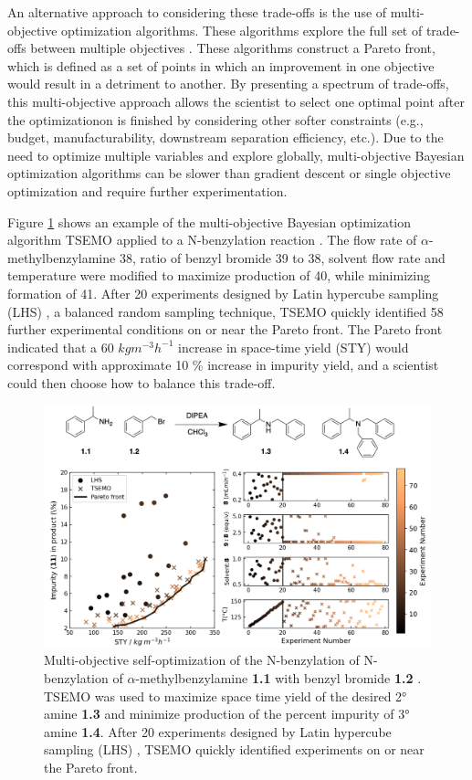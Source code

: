 An alternative approach to considering these trade-offs is the use of multi-objective optimization algorithms. These algorithms explore the full set of trade-offs between multiple objectives \cite{Bradford2018, Schweidtmann2018}. These algorithms construct a Pareto front, which is defined as a set of points in which an improvement in one objective would result in a detriment to another. By presenting a spectrum of trade-offs, this multi-objective approach allows the scientist to select one optimal point after the optimizationon is finished by considering other softer constraints (e.g., budget, manufacturability, downstream separation efficiency, etc.). Due to the need to optimize multiple variables and explore globally, multi-objective Bayesian optimization algorithms can be slower than gradient descent or single objective optimization and require further experimentation.

Figure \ref{fig:schweidtmann_example} shows an example of the multi-objective Bayesian optimization algorithm TSEMO \cite{Bradford2018} applied to a N-benzylation reaction \cite{Schweidtmann2018}. The flow rate of $\alpha$-methylbenzylamine 38, ratio of benzyl bromide 39 to 38, solvent flow rate and temperature were modified to maximize production of 40, while minimizing formation of 41. After 20 experiments designed by Latin hypercube sampling (LHS) \cite{McKay1979}, a balanced random sampling technique, TSEMO quickly identified 58 further experimental conditions on or near the Pareto front. The Pareto front indicated that a 60 $kg m^{-3} h^{-1}$ increase in space-time yield (STY) would correspond with approximate 10 \% increase in impurity yield, and a scientist could then choose how to balance this trade-off.

\begin{figure}
    \centering
    \includegraphics[width=\textwidth]{gfx/Chapter03/schweidtmann_thesis.png}
    \caption{Multi-objective self-optimization of the N-benzylation of N-benzylation of $\alpha$-methylbenzylamine \textbf{1.1} with benzyl bromide \textbf{1.2} \cite{Schweidtmann2018}. TSEMO \cite{Bradford2018} was used to maximize space time yield of the desired 2° amine \textbf{1.3} and minimize production of the percent impurity of 3° amine \textbf{1.4}. After 20 experiments designed by Latin hypercube sampling (LHS) \cite{McKay1979}, TSEMO quickly identified experiments on or near the Pareto front.}
    \label{fig:schweidtmann_example}
\end{figure}


